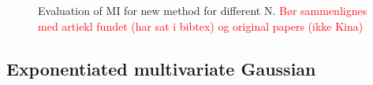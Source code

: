 \documentclass[../Thesis.tex]{subfiles}
\begin{document}
\begin{figure}[H]
\begin{subfigure}[t]{0.49\textwidth}
        \caption{}
        \label{subfig:new MI method all zoom}
    \end{subfigure}
    \caption{Evaluation of MI for new method for different N. \textcolor{red}{Bør sammenlignes med artiekl fundet (har sat i bibtex) og original papers (ikke Kina)}}
    \label{fig:approximation of mutual information knowing the true distribution}
\end{figure}










\subsection{Exponentiated multivariate Gaussian}\label{ex:1}
    
\end{document}
